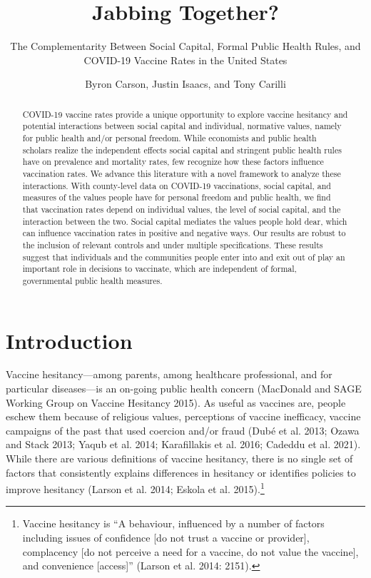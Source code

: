 \documentclass[
]{article}
\title{Jabbing Together?}
\subtitle{The Complementarity Between Social Capital, Formal Public
Health Rules, and COVID-19 Vaccine Rates in the United States}
\author{Byron Carson, Justin Isaacs, and Tony Carilli}
\date{}
\begin{document}
\maketitle
\begin{abstract}
COVID-19 vaccine rates provide a unique opportunity to explore vaccine
hesitancy and potential interactions between social capital and
individual, normative values, namely for public health and/or personal
freedom. While economists and public health scholars realize the
independent effects social capital and stringent public health rules
have on prevalence and mortality rates, few recognize how these factors
influence vaccination rates. We advance this literature with a novel
framework to analyze these interactions. With county-level data on
COVID-19 vaccinations, social capital, and measures of the values people
have for personal freedom and public health, we find that vaccination
rates depend on individual values, the level of social capital, and the
interaction between the two. Social capital mediates the values people
hold dear, which can influence vaccination rates in positive and
negative ways. Our results are robust to the inclusion of relevant
controls and under multiple specifications. These results suggest that
individuals and the communities people enter into and exit out of play
an important role in decisions to vaccinate, which are independent of
formal, governmental public health measures.
\end{abstract}

\newpage

\hypertarget{introduction}{%
\section{Introduction}\label{introduction}}

Vaccine hesitancy---among parents, among healthcare professional, and
for particular diseases---is an on-going public health concern
(MacDonald and SAGE Working Group on Vaccine Hesitancy 2015). As useful
as vaccines are, people eschew them because of religious values,
perceptions of vaccine inefficacy, vaccine campaigns of the past that
used coercion and/or fraud (Dubé et al. 2013; Ozawa and Stack 2013;
Yaqub et al. 2014; Karafillakis et al. 2016; Cadeddu et al. 2021). While
there are various definitions of vaccine hesitancy, there is no single
set of factors that consistently explains differences in hesitancy or
identifies policies to improve hesitancy (Larson et al. 2014; Eskola et
al. 2015).\footnote{Vaccine hesitancy is ``A behaviour, influenced by a
  number of factors including issues of confidence {[}do not trust a
  vaccine or provider{]}, complacency {[}do not perceive a need for a
  vaccine, do not value the vaccine{]}, and convenience {[}access{]}''
  (Larson et al. 2014: 2151).}
\end{document}
